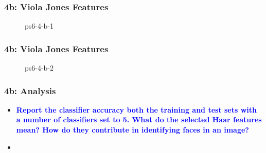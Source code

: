 \documentclass[../report.tex]{subfiles}
\begin{document}
    
    \begin{frame}
        \frametitle{4b: Viola Jones Features}
        \begin{figure}[!htb]
            \centering
            \caption{ps6-4-b-1}
        \end{figure}
    \end{frame}

    \begin{frame}
        \frametitle{4b: Viola Jones Features}
        \begin{figure}[!htb]
            \centering
            \caption{ps6-4-b-2}
        \end{figure}
    \end{frame}

    \begin{frame}[t]
        \frametitle{4b: Analysis}
        \begin{normalsize}
            \begin{itemize}
                \setlength\itemsep{1em}\fontsize{6pt}{6pt}

                \item[]{\textbf{\selectfont\textcolor{blue}{ Report the classifier accuracy both the training and test sets with a number of classifiers set to 5. What do the selected Haar features mean? How do they contribute in identifying faces in an image? }}}
                
                \item[]\textbf{}
            \end{itemize}
        \end{normalsize}
    \end{frame}
\end{document}
